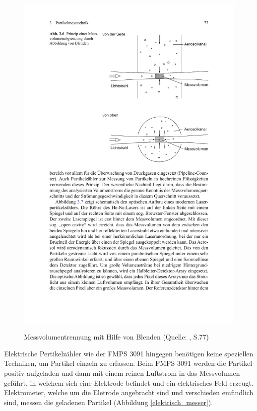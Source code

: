 \begin{figure}[H]
	\myfloatalign
	{\includegraphics[width=.9\linewidth]{gfx/requirements/blenden_fokus.pdf}} \quad
	\caption[Messvolumentrennung mit Hilfe von Blenden (Quelle: \cite{reinraum}, S.77)]
	{Messvolumentrennung mit Hilfe von Blenden (Quelle: \cite{reinraum}, S.77)}
	\label{fig:optisch_trennung}
\end{figure}

Elektrische Pertikelz\"{a}hler wie der FMPS 3091 hingegen ben\"{o}tigen keine speziellen Techniken, um Partikel einzeln zu erfassen. Beim FMPS 3091 werden die Partikel positiv aufgeladen und dann mit einem reinen Luftstrom in das Messvolumen gef\"{u}hrt, in welchem sich eine Elektrode befindet und ein elektrisches Feld erzeugt. Elektrometer, welche um die Eletrode angebracht sind und verschieden emfindlich sind, messen die geladenen Partikel (Abbildung \ref{elektrisch_messer}).

